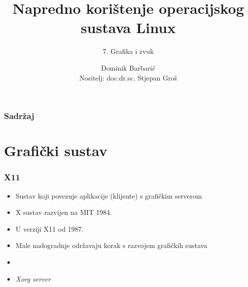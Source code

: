\documentclass[t,table,usenames,dvipsnames]{beamer}
\date{\todayiso}
\title[NKOSL]{Napredno korištenje operacijskog sustava Linux}
\author[Dominik Barbarić]{Dominik Barbarić\\{\small Nositelj: doc.dr.sc. Stjepan Groš}}
\subtitle{7. Grafika i zvuk}
\institute[FER]{Sveučilište u Zagrebu\\Fakultet elektrotehnike i računarstva}
\begin{document}
{
	\begin{frame}
		\maketitle
	\end{frame}
}

\begin{frame}
	\frametitle{Sadržaj}
	\tableofcontents
\end{frame}



\section{Grafički sustav}


\begin{frame}
	\frametitle{X11}
	\begin{itemize}
		\item Sustav koji povezuje aplikacije (klijente) s grafičkim serverom
		\item X sustav razvijen na MIT 1984. 
		\item U verziji X11 od 1987.  
		\item Male nadogradnje održavaju korak s razvojem grafičkih sustava
		\item[]
		\item \emph{Xorg server}
	\end{itemize}
\end{frame}
\end{document}
